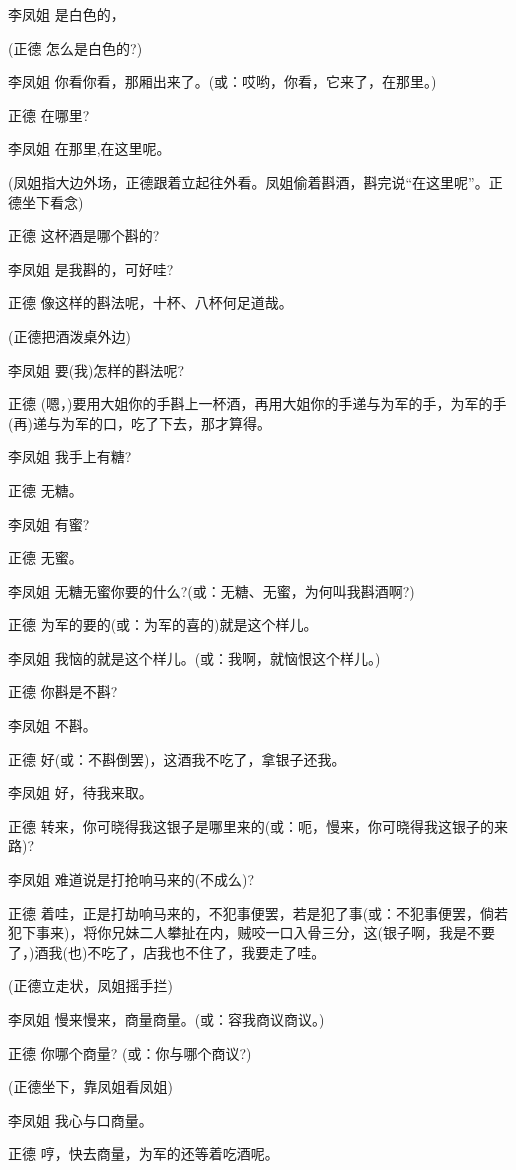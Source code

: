 李凤姐 是白色的，

(正德 怎么是白色的?)

李凤姐 你看你看，那厢出来了。(或：哎哟，你看，它来了，在那里。)

正德 在哪里?

李凤姐 在那里,在这里呢。

(凤姐指大边外场，正德跟着立起往外看。凤姐偷着斟酒，斟完说``在这里呢''。正德坐下看念)

正德 这杯酒是哪个斟的?

李凤姐 是我斟的，可好哇?

正德 像这样的斟法呢，十杯、八杯何足道哉。

(正德把酒泼桌外边)

李凤姐 要(我)怎样的斟法呢?

正德
(嗯，)要用大姐你的手斟上一杯酒，再用大姐你的手递与为军的手，为军的手(再)递与为军的口，吃了下去，那才算得。

李凤姐 我手上有糖?

正德 无糖。

李凤姐 有蜜?

正德 无蜜。

李凤姐 无糖无蜜你要的什么?(或：无糖、无蜜，为何叫我斟酒啊?)

正德 为军的要的(或：为军的喜的)就是这个样儿。

李凤姐 我恼的就是这个样儿。(或：我啊，就恼恨这个样儿。)

正德 你斟是不斟?

李凤姐 不斟。

正德 好(或：不斟倒罢)，这酒我不吃了，拿银子还我。

李凤姐 好，待我来取。

正德
转来，你可晓得我这银子是哪里来的(或：呃，慢来，你可晓得我这银子的来路)?

李凤姐 难道说是打抢响马来的(不成么)?

正德
着哇，正是打劫响马来的，不犯事便罢，若是犯了事(或：不犯事便罢，倘若犯下事来)，将你兄妹二人攀扯在内，贼咬一口入骨三分，这(银子啊，我是不要了，)酒我(也)不吃了，店我也不住了，我要走了哇。

(正德立走状，凤姐摇手拦)

李凤姐 慢来慢来，商量商量。(或：容我商议商议。)

正德 你哪个商量? (或：你与哪个商议?)

(正德坐下，靠凤姐看凤姐)

李凤姐 我心与口商量。

正德 哼，快去商量，为军的还等着吃酒呢。

